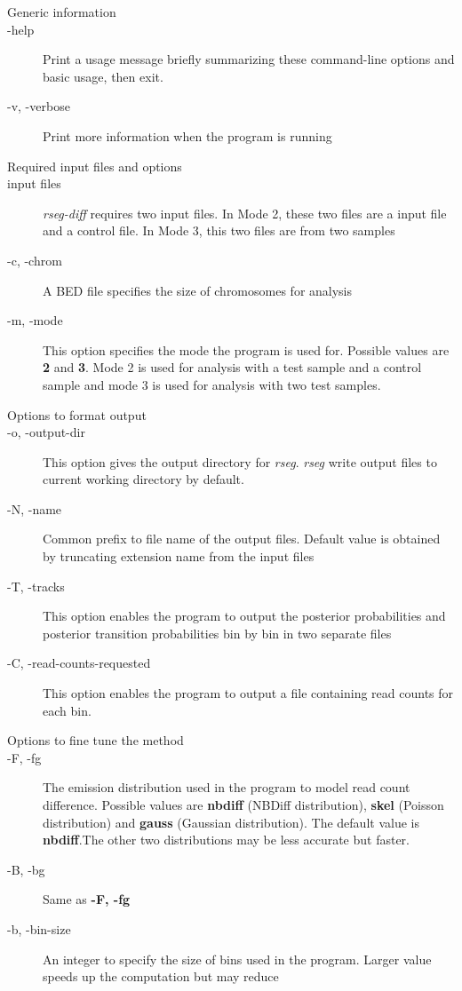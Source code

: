 \documentclass[11pt]{report}
\begin{document}
\begin{description}
\item[Generic information]
\item[-help] Print a usage message briefly summarizing these
  command-line options and basic usage, then exit.
\item[-v, -verbose] Print more information when the program is running
\item[Required input files and options]
\item[input files] \textit{rseg-diff} requires two input files. In
  Mode 2, these two files are a input file and a control file. In Mode
  3, this two files are from two samples  
\item[-c, -chrom] A BED file specifies the size of chromosomes for
  analysis
\item[-m, -mode] This option specifies the mode the program is used
  for. Possible values are \textbf{2} and \textbf{3}. Mode 2 is used
  for analysis with a test sample and a control sample and mode 3 is
  used for analysis with two test samples.
\item[Options to format output]
\item[-o, -output-dir] This option gives the output directory for
  \textit{rseg}. \textit{rseg} write output files to current working
  directory by default.
\item[-N, -name] Common prefix to file name of the output
  files. Default value is obtained by truncating extension name from
the input files
\item[-T, -tracks] This option enables the program to output the
  posterior probabilities and posterior transition probabilities bin
  by bin in two separate files
\item[-C, -read-counts-requested] This option enables the program to
  output a file containing read counts for each bin.  
\item[Options to fine tune the method]
\item[-F, -fg] The emission distribution used in the program to model
  read count difference. Possible values are \textbf{nbdiff} (NBDiff
  distribution), \textbf{skel} (Poisson distribution) and
  \textbf{gauss} (Gaussian distribution). The default value is
  \textbf{nbdiff}.The other two distributions may be less accurate but
  faster.
\item[-B, -bg] Same as \textbf{-F, -fg} 
\item[-b, -bin-size] An integer to specify the size of bins used in
  the program. Larger value speeds up the computation but may reduce

\end{description}
\end{document}
